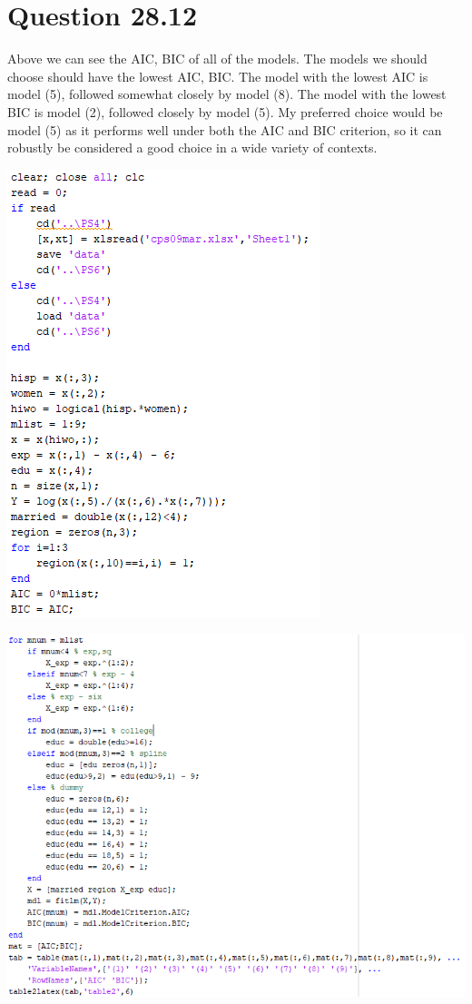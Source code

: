 \documentclass[11pt]{article} %
\begin{document}
\section{Question 28.12}
\begin{center}

\end{center}

Above we can see the AIC, BIC of all of the models. The models we should choose should have the lowest AIC, BIC. The model with the lowest AIC is model (5), followed somewhat closely by model (8). The model with the lowest BIC is model (2), followed closely by model (5). My preferred choice would be model (5) as it performs well under both the AIC and BIC criterion, so it can robustly be considered a good choice in a wide variety of contexts.

\includegraphics{p3}

\includegraphics{p4}
\end{document}
